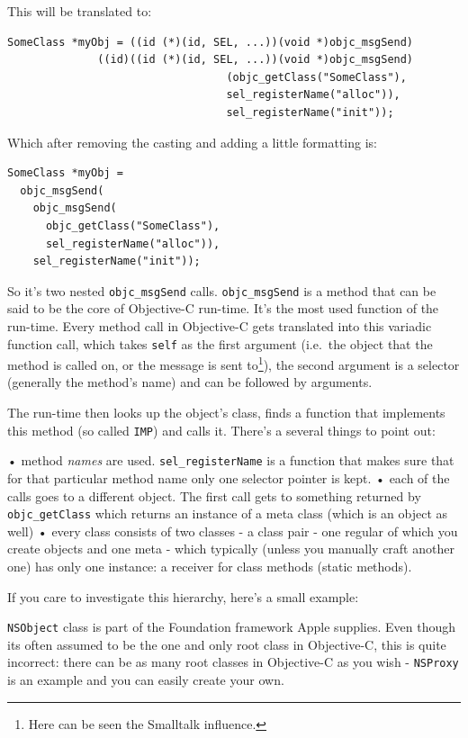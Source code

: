 \documentclass[a4paper, 11pt, fleqn]{book}
\begin{document}
This will be translated to:
\begin{verbatim}SomeClass *myObj = ((id (*)(id, SEL, ...))(void *)objc_msgSend)
              ((id)((id (*)(id, SEL, ...))(void *)objc_msgSend)
                                  (objc_getClass("SomeClass"),
                                  sel_registerName("alloc")), 
                                  sel_registerName("init"));
\end{verbatim}

Which after removing the casting and adding a little formatting is:

\begin{verbatim}SomeClass *myObj = 
  objc_msgSend(
    objc_msgSend(
      objc_getClass("SomeClass"),  
      sel_registerName("alloc")), 
    sel_registerName("init"));
\end{verbatim}

So it's two nested \verb=objc_msgSend= calls. \verb=objc_msgSend= is a method that can be said to be the core of Objective-C run-time. It's the most used function of the run-time. Every method call in Objective-C gets translated into this variadic function call, which takes \verb=self= as the first argument (i.e.\ the object that the method is called on, or the message is sent to\footnote{Here can be seen the Smalltalk influence.}), the second argument is a selector (generally the method's name) and can be followed by arguments.

The run-time then looks up the object's class, finds a function that implements this method (so called \verb=IMP=) and calls it. There's a several things to point out:

• method \emph{names} are used. \verb=sel_registerName= is a function that makes sure that for that particular method name only one selector pointer is kept.
• each of the calls goes to a different object. The first call gets to something returned by \verb=objc_getClass= which returns an instance of a meta class (which is an object as well)
• every class consists of two classes - a class pair - one regular of which you create objects and one meta - which typically (unless you manually craft another one) has only one instance: a receiver for class methods (static methods).

If you care to investigate this hierarchy, here's a small example:

\verb=NSObject= class is part of the Foundation framework Apple supplies. Even though its often assumed to be the one and only root class in Objective-C, this is quite incorrect: there can be as many root classes in Objective-C as you wish - \verb=NSProxy= is an example and you can easily create your own.
\end{document}
